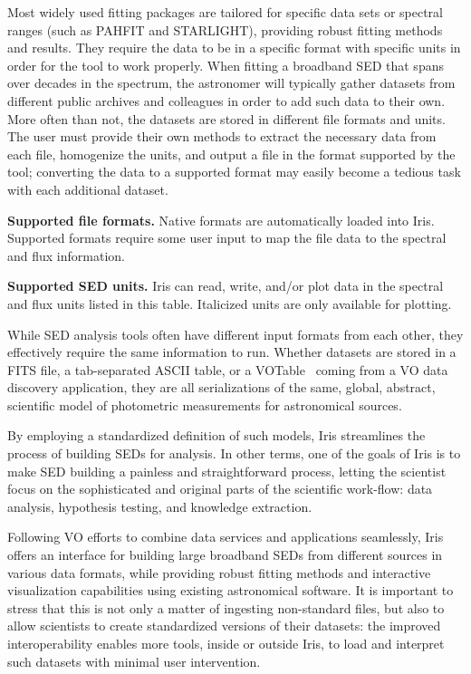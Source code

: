 \documentclass[preprint,authoryear,5p]{elsarticle}
\begin{document}
Most widely used fitting packages are tailored for specific data sets or
spectral ranges (such as PAHFIT and STAR\-LIGHT), providing robust
fitting methods and results. They require the data to be in a specific format
with specific units in order for the tool to work properly. When fitting a
broadband SED that spans over decades in the spectrum, the astronomer will
typically gather datasets from different public archives and colleagues in order
to add such data to their own. More often than not, the datasets are stored in
different file formats and units. 
The user must provide their own methods to extract the necessary data from each
file, homogenize the units, and output a file in the format supported by the
tool; converting the data to a supported format may easily become a tedious task
with each additional dataset.

\begin{table}[tp!]
\caption{\textbf{Supported file formats.} Native formats are automatically loaded into
Iris. Supported formats require some user input to map the file data to the spectral
and flux information.}
\label{table:file_formats}

\end{table}

\begin{table}[h!]
\caption{\textbf{Supported SED units.} Iris can read, write, and/or plot data in
the spectral and flux units listed in this table. Italicized units are only available
for plotting.}
\label{table:units}

\end{table}

While SED analysis tools often have different input formats from each other,
they effectively require the same information to run. Whether datasets are
stored in a FITS file, a tab-separated ASCII table, or a 
VOTable~\citep{2011arXiv1110.0524O} coming from a
VO data discovery application, they are all serializations of the same, global,
abstract, scientific model of photometric measurements for
astronomical sources.

By employing a standardized definition of such models, Iris streamlines
the process of building SEDs for analysis. In other terms, one of the goals of
Iris is to make SED building a painless and straightforward process, letting the
scientist focus on the sophisticated and original parts of the scientific
work-flow: data analysis, hypothesis testing, and knowledge extraction.

Following VO efforts to combine data services and applications seamlessly, Iris
offers an interface for building large broadband SEDs from different sources in
various data formats, while providing robust fitting methods and interactive
visualization capabilities using existing astronomical software.
It is important to stress that this is not only a matter of ingesting
non-standard files, but also to allow scientists to create standardized versions
of their datasets: the improved interoperability enables more tools, inside or
outside Iris, to load and interpret such datasets with minimal user
intervention.
\end{document}

